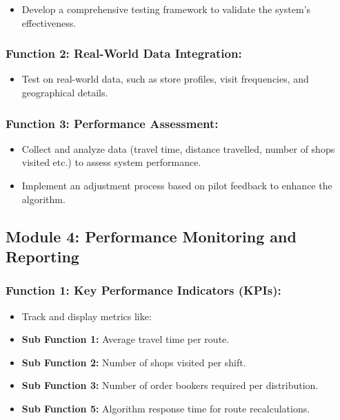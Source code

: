 \begin{itemize}
    \item Develop a comprehensive testing framework to validate the system's effectiveness.
\end{itemize}
\subsubsection*{Function 2: Real-World Data Integration: }

\begin{itemize}
    \item Test on real-world data, such as store profiles, visit frequencies, and geographical details.
\end{itemize}

\subsubsection*{Function 3: Performance Assessment: }
\begin{itemize}
    \item Collect and analyze data (travel time, distance travelled, number of shops visited etc.) to assess system performance.
    \item Implement an adjustment process based on pilot feedback to enhance the algorithm.
\end{itemize}



\subsection*{Module 4: Performance Monitoring and Reporting }

\subsubsection*{Function 1: Key Performance Indicators (KPIs): }

\begin{itemize}
    \item Track and display metrics like:
\end{itemize}
    \begin{itemize}
    \item[] \textbf{Sub Function 1:} Average travel time per route.
    \item[] \textbf{Sub Function 2:} Number of shops visited per shift.
    \item[] \textbf{Sub Function 3:} Number of order bookers required per distribution.
    \item[] \textbf{Sub Function 5:} Algorithm response time for route recalculations.
\end{itemize}
 

